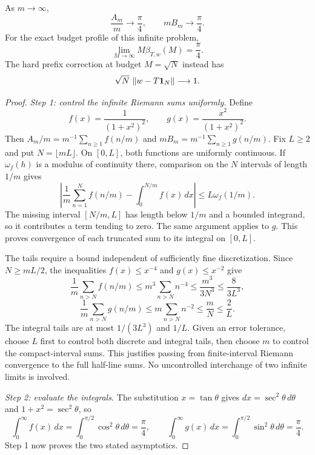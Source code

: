 \begin{theorem}\label{WR11}
As $m\to\infty$,
\[
 \frac{A_m}{m}\longrightarrow\frac\pi4,\qquad
 mB_m\longrightarrow\frac\pi4.
\]
For the exact budget profile of this infinite problem,
\begin{equation}\label{eq:sharp-budget}
 \lim_{M\to\infty}M\beta_{T,w}(M)=\frac\pi4.
\end{equation}
The hard prefix correction at budget $M=\sqrt N$ instead has
\[
 \sqrt N\,\left\lVert w-T\mathbf1_N\right\rVert\longrightarrow1.
\]
\end{theorem}
\begin{proof}
\emph{Step 1: control the infinite Riemann sums uniformly.} Define
\[
 f(x)=\frac1{(1+x^2)^2},\qquad
 g(x)=\frac{x^2}{(1+x^2)^2}.
\]
Then $A_m/m=m^{-1}\sum_{n\ge1}f(n/m)$ and $mB_m=m^{-1}\sum_{n\ge1}g(n/m)$. Fix $L\ge2$ and put $N=\lfloor mL\rfloor$. On $[0,L]$, both functions are uniformly continuous. If $\omega_f(h)$ is a modulus of continuity there, comparison on the $N$ intervals of length $1/m$ gives
\[
 \left|\frac1m\sum_{n=1}^N f(n/m)-\int_0^{N/m}f(x)\,dx\right|
 \le L\omega_f(1/m).
\]
The missing interval $[N/m,L]$ has length below $1/m$ and a bounded integrand, so it contributes a term tending to zero. The same argument applies to $g$. This proves convergence of each truncated sum to its integral on $[0,L]$.

The tails require a bound independent of sufficiently fine discretization. Since $N\ge mL/2$, the inequalities $f(x)\le x^{-4}$ and $g(x)\le x^{-2}$ give
\[
 \frac1m\sum_{n>N}f(n/m)
 \le m^3\sum_{n>N}n^{-4}\le\frac{m^3}{3N^3}
 \le\frac8{3L^3},
\]
\[
 \frac1m\sum_{n>N}g(n/m)
 \le m\sum_{n>N}n^{-2}\le\frac mN\le\frac2L.
\]
The integral tails are at most $1/(3L^3)$ and $1/L$. Given an error tolerance, choose $L$ first to control both discrete and integral tails, then choose $m$ to control the compact-interval sums. This justifies passing from finite-interval Riemann convergence to the full half-line sums. No uncontrolled interchange of two infinite limits is involved.

\emph{Step 2: evaluate the integrals.} The substitution $x=\tan\theta$ gives $dx=\sec^2\theta\,d\theta$ and $1+x^2=\sec^2\theta$, so
\[
 \int_0^\infty f(x)\,dx=\int_0^{\pi/2}\cos^2\theta\,d\theta=\frac\pi4,
 \qquad
 \int_0^\infty g(x)\,dx=\int_0^{\pi/2}\sin^2\theta\,d\theta=\frac\pi4.
\]
Step 1 now proves the two stated asymptotics.


\end{proof}
